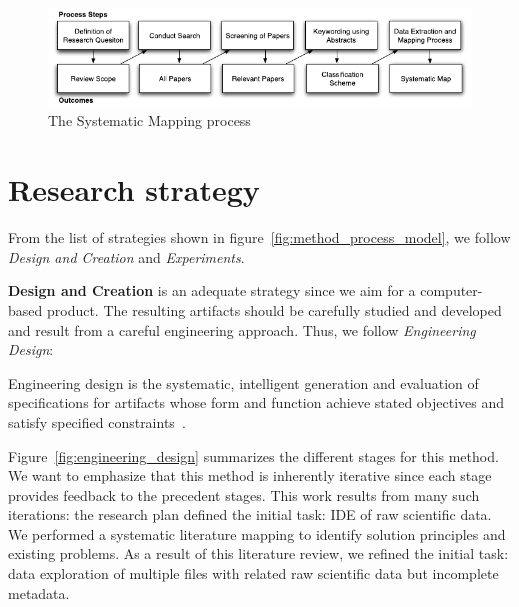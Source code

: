 \begin{figure}[htbp]
    \centering
    \includegraphics{images/3_mapping/systematicmapping_diagram}
    \caption{The Systematic Mapping process}
    \label{fig:systematicmapping_diagram}
\end{figure}

\section{Research strategy}
\label{sec:method_strategy}
From the list of strategies shown in figure~\ref{fig:method_process_model},
we follow \emph{Design and Creation} and \emph{Experiments}.

\textbf{Design and Creation} is an adequate strategy since we aim for a
computer-based product. The resulting artifacts should be carefully studied and developed and result from a careful engineering approach.
Thus, we follow \emph{Engineering Design}:
    
\begin{displayquote}
  Engineering design is the systematic, intelligent generation and evaluation
  of specifications for artifacts whose form and function achieve stated
  objectives and satisfy specified constraints~\cite{Dym2012}.
\end{displayquote}

Figure~\ref{fig:engineering_design} summarizes the different stages for this method.
We want to emphasize that this method is inherently iterative since each stage
provides feedback to the precedent stages. This work results from many such
iterations: the research plan defined the initial task: \gls{IDE} of raw scientific data.
We performed a systematic literature mapping to identify solution principles and existing problems.
As a result of this literature review, we refined the initial task: data exploration of multiple files with related raw scientific data but incomplete metadata.

